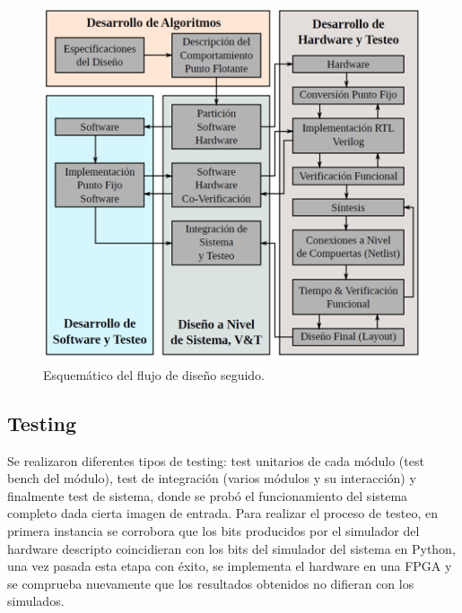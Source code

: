 \begin{figure}
\centering
\includegraphics{flujo_de_dis.png}
\caption{Esquemático del flujo de diseño seguido.}
\label{design_flow}
\end{figure}

\subsection{Testing}

Se realizaron diferentes tipos de testing: test
unitarios de cada módulo (test bench del módulo), test de integración (varios
módulos y su interacción) y finalmente test de sistema, donde se probó el
funcionamiento del sistema completo dada cierta imagen de entrada. Para realizar
el proceso de testeo, en primera instancia se corrobora que los bits producidos
por el simulador del hardware descripto coincidieran con los bits del simulador
del sistema en Python, una vez pasada esta etapa con éxito, se implementa el
hardware en una FPGA y se comprueba nuevamente que los resultados obtenidos no
difieran con los simulados.


